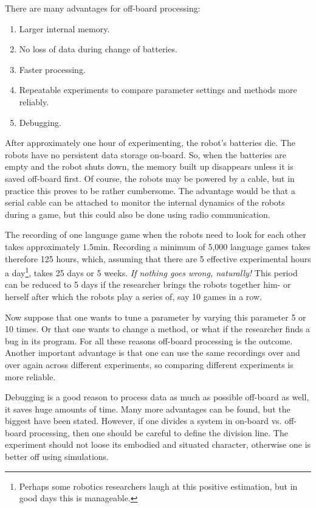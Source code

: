 There are many advantages for off-board processing:

\begin{enumerate}
\item Larger internal memory.
\item No loss of data during change of batteries.
\item Faster processing.
\item Repeatable experiments to compare parameter settings and methods more reliably.
\item Debugging.
\end{enumerate}


After approximately one hour of experimenting, the robot's batteries die. The robots have no persistent data storage on-board. So, when the batteries are empty and the robot shuts down, the memory built up disappears unless it is saved off-board first. Of course, the robots may be powered by a cable, but in practice this proves to be rather cumbersome. The advantage would be that a serial cable can be attached to monitor the internal dynamics of the robots during a game, but this could also be done using radio communication.

The recording of one language game when the robots need to look for each other takes approximately $1.5 \mbox{min}$. Recording a minimum of 5,000 language games takes therefore 125 hours, which, assuming that there are 5 effective experimental hours a day\footnote{Perhaps some robotics researchers laugh at this positive estimation, but in good days this is manageable.}, takes 25 days or 5 weeks. {\em If nothing goes wrong, naturally!} This period can be reduced to 5 days if the researcher brings the robots together him- or herself after which the robots play a series of, say 10 games in a row. 

Now suppose that one wants to tune a parameter by varying this parameter 5 or 10 times. Or that one wants to change a method, or what if the researcher finds a bug in its program. For all these reasons off-board processing is the outcome. Another important advantage is that one can use the same recordings over and over again across different experiments, so comparing different experiments is more reliable.


Debugging is a good reason to process data as much as possible off-board as well, it saves huge amounts of time. Many more advantages can be found, but the biggest have been stated. However, if one divides a system in on-board vs. off-board processing, then one should be careful to define the division line. The experiment should not loose its embodied and situated character, otherwise one is better off using simulations.


